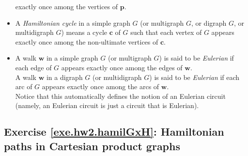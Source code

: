 \documentclass[numbers=enddot,12pt,final,onecolumn,notitlepage]{scrartcl}%
\theoremstyle{definition}
\begin{document}
\begin{itemize}
      exactly once among the vertices of $\mathbf{p}$.
\item A \textit{Hamiltonian cycle} in a simple graph $G$ (or
      multigraph $G$, or digraph $G$, or multidigraph $G$) means a
      cycle $\mathbf{c}$ of $G$ such that each vertex of $G$ appears
      exactly once among the non-ultimate vertices of $\mathbf{c}$.
\item A walk $\mathbf{w}$ in a simple graph $G$ (or multigraph $G$) is
      said to be \textit{Eulerian} if each edge of $G$ appears exactly
      once among the edges of $\mathbf{w}$. \\
      A walk $\mathbf{w}$ in a digraph $G$ (or multidigraph $G$) is
      said to be \textit{Eulerian} if each arc of $G$ appears exactly
      once among the arcs of $\mathbf{w}$. \\
      Notice that this automatically defines the notion of an Eulerian
      circuit (namely, an Eulerian circuit is just a circuit that is
      Eulerian).
\end{itemize}

\subsection{Exercise \ref{exe.hw2.hamilGxH}: Hamiltonian paths in
Cartesian product graphs}
\end{document}
